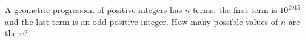 A geometric progression of positive integers has $n$ terms; the first term is $10^{2015}$ and the last term is an odd positive integer. How many possible values of $n$ are there?
